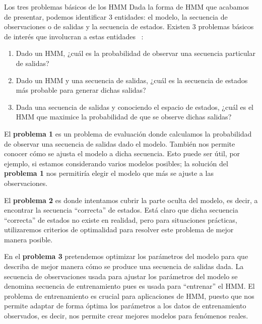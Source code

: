 \begin{section}{Los tres problemas básicos de los HMM}
Dada la forma de HMM que acabamos de presentar, podemos identificar 3 entidades: el modelo, la secuencia de observaciones o de salidas y la secuencia de estados. Existen 3 problemas básicos de interés que involucran a estas entidades ~\cite{Vidyasagar}:
\begin{enumerate}
    \item Dado un HMM, ¿cuál es la probabilidad de observar una secuencia particular de salidas?
    \item Dado un HMM y una secuencia de salidas, ¿cuál es la secuencia de estados más probable para generar dichas salidas?
    \item Dada una secuencia de salidas y conociendo el espacio de estados, ¿cuál es el HMM que maximice la probabilidad de que se observe dichas salidas?
\end{enumerate}

El \textbf{problema 1} es un problema de evaluación donde calculamos la probabilidad de observar una secuencia de salidas dado el modelo. También nos permite conocer cómo se ajusta el modelo a dicha secuencia. Esto puede ser útil, por ejemplo, si estamos considerando varios modelos posibles; la solución del \textbf{problema 1} nos permitiría elegir el modelo que más se ajuste a las observaciones.

El \textbf{problema 2} es donde intentamos cubrir la parte oculta del modelo, es decir, a encontrar la secuencia \enquote{correcta} de estados. Está claro que dicha secuencia \enquote{correcta} de estados no existe en realidad, pero para situaciones prácticas, utilizaremos criterios de optimalidad para resolver este problema de mejor manera posible. 

En el \textbf{problema 3} pretendemos optimizar los parámetros del modelo para que describa de mejor manera cómo se produce una secuencia de salidas dada. La secuencia de observaciones usada para ajustar los parámetros del modelo se denomina secuencia de entrenamiento pues es usada para \enquote{entrenar} el HMM. El problema de entrenamiento es crucial para aplicaciones de HMM, puesto que nos permite adaptar de forma óptima los parámetros a los datos de entrenamiento observados, es decir, nos permite crear mejores modelos para fenómenos reales.


\end{section}
